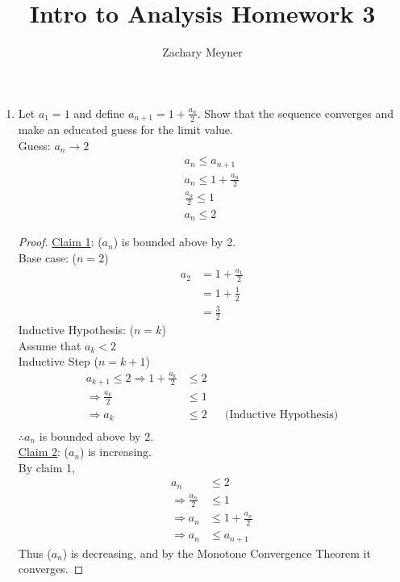 \documentclass[12pt]{article}
\title{\large Intro to Analysis Homework 3}
\author{\large Zachary Meyner}
\date{}
\begin{document}
\maketitle
\begin{enumerate}
	\item Let $a_1 = 1$ and define $a_{n+1} = 1 + \frac{a_n}{2}$. Show that the sequence converges and make an
	      educated guess for the limit value. \\
	      Guess: $a_n \rightarrow 2$
	      \begin{gather*}
		      a_n \leq a_{n+1} \\
		      a_n \leq 1 + \frac{a_n}{2} \\
		      \frac{a_n}{2} \leq 1 \\
		      a_n \leq 2
	      \end{gather*}
	      \begin{proof}
		      \underline{Claim 1}: ($a_n$) is bounded above by 2. \\
		      Base case: ($n = 2$)
		      \begin{align*}
			      a_2 & = 1+\frac{a_1}{2} \\
			          & = 1+\frac{1}{2}   \\
			          & = \frac{3}{2}
		      \end{align*}
		      Inductive Hypothesis: ($n = k$) \\
		      Assume that $a_k < 2$ \\
		      Inductive Step ($n = k+1$)
		      \begin{align*}
			      a_{k+1} \leq 2  \Rightarrow 1+\frac{a_k}{2} & \leq 2                                    \\
			      \Rightarrow \frac{a_k}{2}                   & \leq 1                                    \\
			      \Rightarrow a_k                             & \leq 2 &  & \text{(Inductive Hypothesis)} \\
		      \end{align*}
		      $\therefore a_n$ is bounded above by $2$. \\
		      \underline{Claim 2}: ($a_n$) is increasing. \\
		      By claim 1,
		      \begin{align*}
			      a_n &\leq 2  \\
                  \Rightarrow \frac{a_n}{2} &\leq 1 \\
                  \Rightarrow a_n &\leq 1+\frac{a_n}{2} \\
                  \Rightarrow a_n &\leq a_{n+1}
		      \end{align*}
              Thus ($a_n$) is decreasing, and by the Monotone Convergence Theorem it converges.
	      \end{proof}
\end{enumerate}
\end{document}

